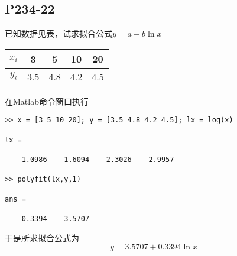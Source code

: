 \subsection{P234-22}
已知数据见表，试求拟合公式$y=a + b \ln x$
\begin{center}
\begin{tabular}{c|c c c c}
$x_i$ & 3 & 5 & 10 & 20 \\
\hline
$y_i$ & 3.5 & 4.8 & 4.2 & 4.5
\end{tabular}
\end{center}
\begin{SOLVE}
在Matlab命令窗口执行
\begin{lstlisting}
>> x = [3 5 10 20]; y = [3.5 4.8 4.2 4.5]; lx = log(x)

lx =

    1.0986    1.6094    2.3026    2.9957

>> polyfit(lx,y,1)

ans =

    0.3394    3.5707
\end{lstlisting}
于是所求拟合公式为
\begin{displaymath}
y = 3.5707 + 0.3394 \ln x
\end{displaymath}
\end{SOLVE}
